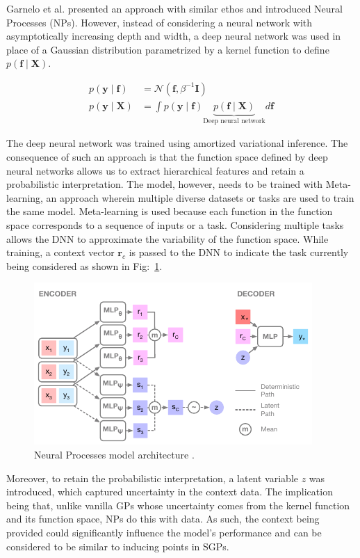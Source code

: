 \documentclass[letterpaper,11pt]{extarticle}
\begin{document}
Garnelo et al. \cite{GarneloSRVRET18} presented an approach with similar ethos and introduced Neural Processes (NPs). However, instead of considering a neural network with asymptotically increasing depth and width, a deep neural network was used in place of a Gaussian distribution parametrized by a kernel function to define $p(\mathbf{f} \mid \mathbf{X})$. 

$$
\begin{aligned}
p(\mathbf{y} \mid \mathbf{f}) &= \mathcal{N}\left(\mathbf{f}, \beta^{-1} \mathbf{I}\right) \\
p(\mathbf{y} \mid \mathbf{X}) &= \int p(\mathbf{y} \mid \mathbf{f})\underbrace{p(\mathbf{f} \mid \mathbf{X})}_\text{Deep neural network} d \mathbf{f}
\end{aligned}
$$

The deep neural network was trained using amortized variational inference. The consequence of such an approach is that the function space defined by deep neural networks allows us to extract hierarchical features and retain a probabilistic interpretation. The model, however, needs to be trained with Meta-learning, an approach wherein multiple diverse datasets or tasks are used to train the same model. Meta-learning is used because each function in the function space corresponds to a sequence of inputs or a task. Considering multiple tasks allows the DNN to approximate the variability of the function space. While training, a context vector $\mathbf{r}_c$ is passed to the DNN to indicate the task currently being considered as shown in Fig:~\ref{fig:NPs}. 

\begin{figure}[htp]
    \centering
    \includegraphics[width=0.6\linewidth]{figs/NPs.pdf}
    \caption{Neural Processes model architecture \cite{KimMSGERVT18}.}
    \label{fig:NPs}
\end{figure}

Moreover, to retain the probabilistic interpretation, a latent variable $z$ was introduced, which captured uncertainty in the context data. The implication being that, unlike vanilla GPs whose uncertainty comes from the kernel function and its function space, NPs do this with data. As such, the context being provided could significantly influence the model's performance and can be considered to be similar to inducing points in SGPs. 
\end{document}

